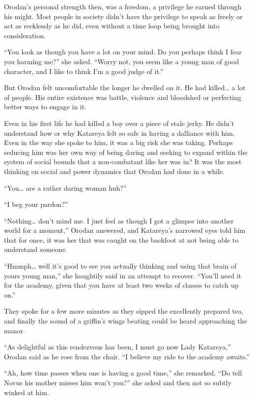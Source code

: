 \documentclass[a4paper,10pt]{book}
\begin{document}
Orodan’s personal strength then, was a freedom, a privilege he earned through his might. Most people in society didn’t have the privilege to speak as freely or act as recklessly as he did, even without a time loop being brought into consideration.\par
“You look as though you have a lot on your mind. Do you perhaps think I fear you harming me?” she asked. “Worry not, you seem like a young man of good character, and I like to think I’m a good judge of it.”\par
But Orodan felt uncomfortable the longer he dwelled on it. He had killed… a lot of people. His entire existence was battle, violence and bloodshed or perfecting better ways to engage in it.\par
Even in his first life he had killed a boy over a piece of stale jerky. He didn’t understand how or why Katareya felt so safe in having a dalliance with him. Even in the way she spoke to him, it was a big risk she was taking. Perhaps seducing him was her own way of being daring and seeking to expand within the system of social bounds that a non-combatant like her was in? It was the most thinking on social and power dynamics that Orodan had done in a while.\par
“You… are a rather daring woman huh?”\par
“I beg your pardon?”\par
“Nothing… don’t mind me. I just feel as though I got a glimpse into another world for a moment,” Orodan answered, and Katareya’s narrowed eyes told him that for once, it was her that was caught on the backfoot at not being able to understand someone.\par
“Hmmph… well it’s good to see you actually thinking and using that brain of yours young man,” she haughtily said in an attempt to recover. “You’ll need it for the academy, given that you have at least two weeks of classes to catch up on.”\par
They spoke for a few more minutes as they sipped the excellently prepared tea, and finally the sound of a griffin’s wings beating could be heard approaching the manor.\par
“As delightful as this rendezvous has been, I must go now Lady Katareya,” Orodan said as he rose from the chair. “I believe my ride to the academy awaits.”\par
“Ah, how time passes when one is having a good time,” she remarked. “Do tell Novus his mother misses him won’t you?” she asked and then not so subtly winked at him.\par
\end{document}
